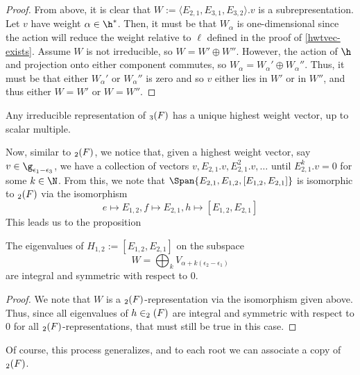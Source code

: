 \documentclass[11pt,leqno,oneside]{amsart}
\numberwithin{thm}{section}
\begin{document}
\begin{proof}
  From above, it is clear that \(W := \langle E_{2,1}, E_{3,1},
  E_{3,2} \rangle.v\) is a subrepresentation. Let \(v\) have weight
  \(\alpha \in \h^*\). Then, it must be that \(W_\alpha\) is
  one-dimensional since the action will reduce the weight relative to
  \(\ell\) defined in the proof of \ref{hwtvec-exists}. Assume \(W\) is not
  irreducible, so \(W = W' \oplus W''\). However, the action of \(\h\)
  and projection onto either component commutes, so \(W_\alpha =
  W_{\alpha}' \oplus W_{\alpha}''\). Thus, it must be that either
  \(W_\alpha'\) or \(W_\alpha''\) is zero and so \(v\) either lies in
  \(W'\) or in \(W''\), and thus either \(W = W'\) or \(W = W''\).
\end{proof}
\begin{cor}
  Any irreducible representation of \(\sl_3(F)\) has a unique highest
  weight vector, up to scalar multiple.
\end{cor}
Now, similar to \(\sl_2(F)\), we notice that, given a highest weight
vector, say \(v \in \g_{\epsilon_1-\epsilon_3}\), we have a collection
of vectors \(v, E_{2,1}.v, E_{2,1}^2.v, \ldots\) until \(E_{2,1}^k.v =
0\) for some \(k \in \N\). From this, we note that \(\Span\{E_{2,1},E_{1,2},[E_{1,2},E_{2,1}]\}\) is isomorphic to
\(\sl_2(F)\) via the isomorphism \[
  e \mapsto E_{1,2}, f \mapsto E_{2,1}, h \mapsto [E_{1,2},E_{2,1}]
\]
This leads us to the proposition
\begin{prop}
  The eigenvalues of \(H_{1,2} := [E_{1,2},E_{2,1}]\) on the
  subspace \[
    W = \bigoplus_k V_{\alpha+k(\epsilon_2-\epsilon_1)}
  \]
  are integral and symmetric with respect to \(0\).
\end{prop}
\begin{proof}
  We note that \(W\) is a \(\sl_2(F)\)-representation via the
  isomorphism given above. Thus, since all eigenvalues of
  \(h \in \sl_2(F)\) are integral and symmetric with respect to \(0\)
  for all \(\sl_2(F)\)-representations, that must still be true in
  this case.
\end{proof}
Of course, this process generalizes, and to each root we can
associate a copy of \(\sl_2(F)\).
\end{document}
